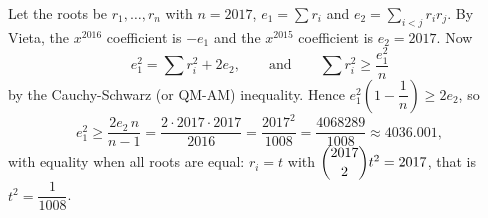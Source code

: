 Let the roots be $r_1,\dots,r_n$ with $n=2017$, $e_1=\sum r_i$ and $e_2=\sum_{i<j}r_ir_j$. By Vieta, the $x^{2016}$ coefficient is $-e_1$ and the $x^{2015}$ coefficient is $e_2=2017$. Now
\[
e_1^2=\sum r_i^2+2e_2,\qquad\text{and}\qquad \sum r_i^2\ge\dfrac{e_1^2}{n}
\]
by the Cauchy-Schwarz (or QM-AM) inequality. Hence $e_1^2\left(1-\dfrac{1}{n}\right)\ge2e_2$, so
\[
e_1^2\ge\dfrac{2e_2\,n}{n-1}=\dfrac{2\cdot2017\cdot2017}{2016}=\boxed{\dfrac{2017^2}{1008}}=\dfrac{4068289}{1008}\approx4036.001,
\]
with equality when all roots are equal: $r_i=t$ with $\dbinom{2017}{2}t^2=2017$, that is $t^2=\dfrac{1}{1008}$.
